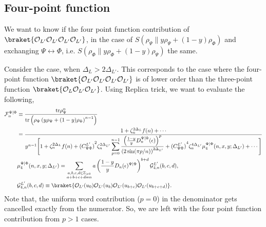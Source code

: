 \documentclass[11pt]{article}
\newcommand{\ep}{\epsilon}
\newcommand{\mO}{\mathcal{O}}
\newcommand{\lb}{\left(}
\newcommand{\rb}{\right)}
\begin{document}
\subsection{Four-point function}
We want to know if the four point function contribution of $\braket{\mO_{L'}\mO_{L'}\mO_{L'}\mO_{L'}}$, in the case of $S(\rho_\Psi \| y\rho_\Psi + (1-y)\rho_\Phi)$ and exchanging $\Psi\leftrightarrow \Phi$, i.e. $S(\rho_\Phi \| y\rho_\Phi + (1-y)\rho_\Psi)$ the same. 

Consider the case, when $\Delta_L >2\Delta_{L'}$. This corresponds to the case where the four-point function $\braket{\mO_{L'}\mO_{L'}\mO_{L'}\mO_{L'}}$ is of lower order than the three-point function $\braket{\mO_L \mO_{L'}\mO_{L'}}$. Using Replica trick, we want to evaluate the following,
\begin{align}
    \mathcal{F}_n^{\Psi|\Phi} &\equiv \frac{\text{tr}\rho_\Psi^n}{\text{tr}\lb\rho_\Psi \lb y\rho_\Psi + (1-y)\rho_\Phi\rb^{n-1}\rb}  \\
    &= \frac{1+ \zeta_n^{2\Delta_{L}}f(n)+ \cdots}{y^{n-1}\Bigg[ 1+ \zeta_n^{2\Delta_L}f(n) + \displaystyle {(C_{\Psi\Phi}^{L'})}^2\zeta_n^{2\Delta_{L'}}\sum_{p=0}^{n-1}\frac{\lb\frac{1-y}{y}D_n^{\Psi|\Phi}(\ep)\rb^p}{\lb 2\sin(\pi p/n)\rb^{2\Delta_{L'}}} + {(C_{\Psi\Phi}^{L'})}^4\zeta_n^{4\Delta_{L'}}\mu_4^{\Psi|\Phi}(n,x,y;\Delta_{L'})+ \cdots\Bigg]} \\
    &\mu_4^{\Psi|\Phi}(n,x,y;\Delta_{L'})
=
\sum_{\substack{
a,b,c,d\in \mathbb{Z}_{>0}\\
a+b+c+d=n
}}
a
\lb
\frac{1-y}{y}D_n(\ep)^{\Psi|\Phi}
\rb^{b+d}
\mathcal{G}_{4,n}^{L'}(b,c,d),
\\
&\mathcal{G}_{4,n}^{L'}(b,c,d)
\equiv
\braket{
\mO_{L'}(u_0)
\mO_{L'}(u_b)
\mO_{L'}(u_{b+c})
\mO_{L'}(u_{b+c+d})
}.
\end{align}
Note that, the uniform word contribution ($p=0$) in the denominator gets cancelled exactly from the numerator. So, we are left with the four point function contribution from $p>1$ cases. 
\end{document}
